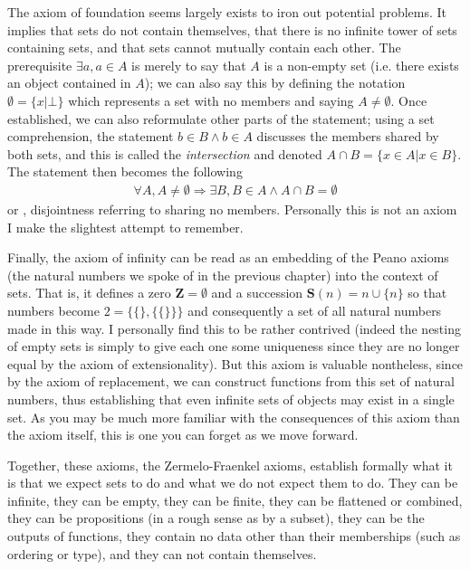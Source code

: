 \documentclass[11pt]{article}
\begin{document}
The axiom of foundation seems largely exists to iron out potential problems. It implies that sets do not contain themselves, that there is no infinite tower of sets containing sets, and that sets cannot mutually contain each other. The prerequisite $\exists a, a \in A$ is merely to say that $A$ is a non-empty set (i.e. there exists an object contained in $A$); we can also say this by defining the notation $\emptyset = \{x | \bot\}$ which represents a set with no members and saying $A \neq \emptyset$. Once established, we can also reformulate other parts of the statement; using a set comprehension, the statement $b \in B \wedge b \in A$ discusses the members shared by both sets, and this is called the \emph{intersection} and denoted $A\cap B = \{x \in A | x \in B\}$. The statement then becomes the following \begin{gather*}
\forall A, A \neq \emptyset \Rightarrow \exists B, B \in A \wedge A \cap B = \emptyset
\end{gather*}
or , disjointness referring to sharing no members. Personally this is not an axiom I make the slightest attempt to remember.

Finally, the axiom of infinity can be read as an embedding of the Peano axioms (the natural numbers we spoke of in the previous chapter) into the context of sets. That is, it defines a zero $\mathbf{Z} = \emptyset$ and a succession $\mathbf{S}(n) = n \cup \{n\}$ so that numbers become $2 = \{\{\},\{\{\}\}\}$ and consequently a set of all natural numbers made in this way. I personally find this to be rather contrived (indeed the nesting of empty sets is simply to give each one some uniqueness since they are no longer equal by the axiom of extensionality). But this axiom is valuable nontheless, since by the axiom of replacement, we can construct functions from this set of natural numbers, thus establishing that even infinite sets of objects may exist in a single set. As you may be much more familiar with the consequences of this axiom than the axiom itself, this is one you can forget as we move forward.

Together, these axioms, the Zermelo-Fraenkel axioms, establish formally what it is that we expect sets to do and what we do not expect them to do. They can be infinite, they can be empty, they can be finite, they can be flattened or combined, they can be propositions (in a rough sense as by a subset), they can be the outputs of functions, they contain no data other than their memberships (such as ordering or type), and they can not contain themselves. 
\end{document}
